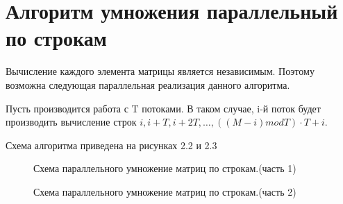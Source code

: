 \documentclass[12pt,a4paper]{report}
\begin{document}
\section*{Алгоритм умножения параллельный по строкам}

Вычисление каждого элемента матрицы является независимым. Поэтому возможна следующая параллельная 
реализация данного алгоритма. 

Пусть производится работа с T потоками. В таком случае, i-й поток будет производить вычисление строк
$i, i + T, i + 2T, \dots, ((M - i) mod T) \cdot T + i$.

Схема алгоритма приведена на рисунках 2.2 и 2.3


\begin{figure}[ht!]
	\caption{Схема параллельного умножение матриц по строкам.(часть 1)}
\end{figure}


\begin{figure}[ht!]
	\caption{Схема параллельного умножение матриц по строкам.(часть 2)}
\end{figure}
\end{document}
